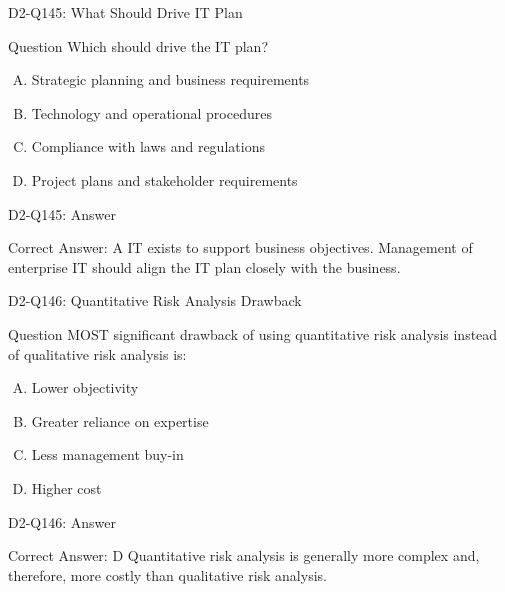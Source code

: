 \documentclass{beamer}
\begin{document}
	\begin{frame}{D2-Q145: What Should Drive IT Plan}
		\begin{block}{Question}
			Which should drive the IT plan?
		\end{block}
		\begin{enumerate}[(A)]
			\item Strategic planning and business requirements
			\item Technology and operational procedures
			\item Compliance with laws and regulations
			\item Project plans and stakeholder requirements
		\end{enumerate}
	\end{frame}
	\begin{frame}{D2-Q145: Answer}
		\begin{block}{Correct Answer: A}
			IT exists to support business objectives. Management of enterprise IT should align the IT plan closely with the business.
		\end{block}
	\end{frame}
	
	\begin{frame}{D2-Q146: Quantitative Risk Analysis Drawback}
		\begin{block}{Question}
			MOST significant drawback of using quantitative risk analysis instead of qualitative risk analysis is:
		\end{block}
		\begin{enumerate}[(A)]
			\item Lower objectivity
			\item Greater reliance on expertise
			\item Less management buy-in
			\item Higher cost
		\end{enumerate}
	\end{frame}
	\begin{frame}{D2-Q146: Answer}
		\begin{block}{Correct Answer: D}
			Quantitative risk analysis is generally more complex and, therefore, more costly than qualitative risk analysis.
		\end{block}
	\end{frame}
	
\end{document}
